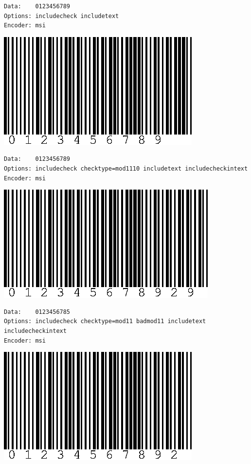 \begin{verbatim}
Data:    0123456789
Options: includecheck includetext
Encoder: msi
\end{verbatim}

\includegraphics{images/msi-1.eps}

\begin{verbatim}
Data:    0123456789
Options: includecheck checktype=mod1110 includetext includecheckintext
Encoder: msi
\end{verbatim}

\includegraphics{images/msi-2.eps}

\begin{verbatim}
Data:    0123456785
Options: includecheck checktype=mod11 badmod11 includetext includecheckintext
Encoder: msi
\end{verbatim}

\includegraphics{images/msi-3.eps}

